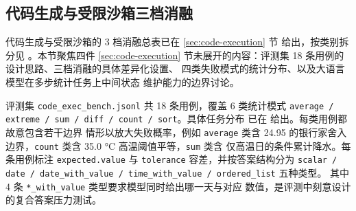 ﻿%

\subsection{代码生成与受限沙箱三档消融}
\label{sec:code-eval}

代码生成与受限沙箱的 3 档消融总表已在 \ref{sec:code-execution} 节
 给出，按类别拆分见
。本节聚焦四件 \ref{sec:code-execution}
节未展开的内容：评测集 18 条用例的设计思路、三档消融的具体差异化设置、
四类失败模式的统计分布、以及大语言模型在多步统计任务上中间状态
维护能力的边界讨论。

评测集 \texttt{code\_\bk{}exec\_\bk{}bench.\bk{}jsonl} 共 18 条用例，覆盖 6 类统计模式
\texttt{average /\bk{} extreme /\bk{} sum /\bk{} diff /\bk{} count /\bk{} sort}。具体任务分布
已在  给出。每类用例都故意包含若干边界
情形以放大失败概率，例如 \texttt{average} 类含 24.95 的银行家舍入
边界，\texttt{count} 类含 35.0 °C 高温阈值平等，\texttt{sum} 类含
仅高温日的条件累计降水。每条用例标注 \texttt{expected.\bk{}value} 与
\texttt{tolerance} 容差，并按答案结构分为 \texttt{scalar /\bk{} date /\bk{}
date\_\bk{}with\_\bk{}value /\bk{} time\_\bk{}with\_\bk{}value /\bk{} ordered\_\bk{}list} 五种类型。
其中 4 条 \texttt{*\_\bk{}with\_\bk{}value} 类型要求模型同时给出哪一天与对应
数值，是评测中刻意设计的复合答案压力测试。

